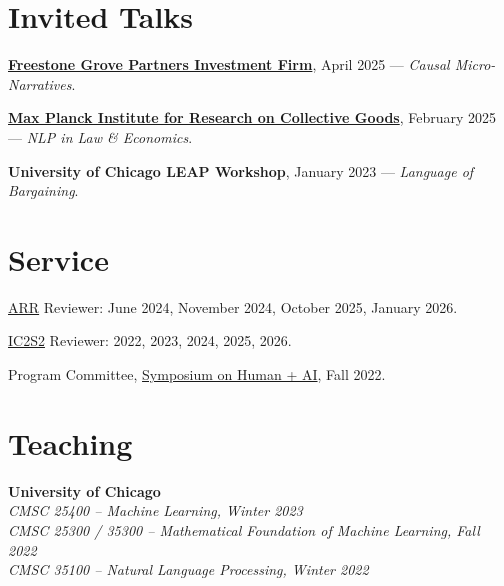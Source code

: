 \documentclass[11pt,letterpaper]{article}
\begin{document}
\section*{Invited Talks}
\begin{cvitems}

\item \href{https://fgrovep.com}{\textbf{Freestone Grove Partners Investment Firm}}, April 2025 --- \textit{Causal Micro-Narratives}.


\item \href{https://www.coll.mpg.de}{\textbf{Max Planck Institute for Research on Collective Goods}}, February 2025 --- \textit{NLP in Law \& Economics}.


\item \textbf{University of Chicago LEAP Workshop}, January 2023 --- \textit{Language of Bargaining}.
    
\end{cvitems}

\section*{Service}

\begin{cvitems}
    \item \href{https://aclrollingreview.org}{ARR} Reviewer: June 2024, November 2024, October 2025, January 2026.
    \item \href{https://ic2s2-2026.org}{IC2S2} Reviewer: 2022, 2023, 2024, 2025, 2026.
    \item Program Committee, \href{https://datascience.uchicago.edu/events/human-ai-conference/}{Symposium on Human + AI}, Fall 2022.
\end{cvitems}

\section*{Teaching}

\noindent\textbf{University of Chicago}\\
\hspace*{2em}\textit{CMSC 25400 -- Machine Learning, Winter 2023}\\
\hspace*{2em}\textit{CMSC 25300 / 35300 -- Mathematical Foundation of Machine Learning, Fall 2022}\\
\hspace*{2em}\textit{CMSC 35100 -- Natural Language Processing, Winter 2022}
\end{document}
